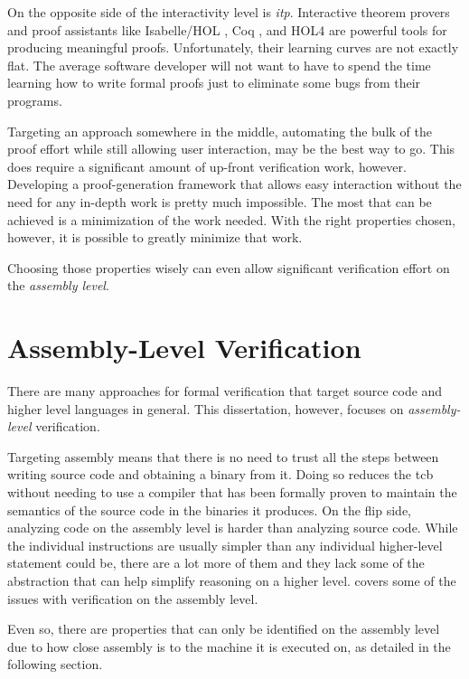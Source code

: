 On the opposite side of the interactivity level is \emph{\ac{itp}}.
Interactive theorem provers and proof assistants
like Isabelle/HOL \autocite{nipkow2002isabelle}, Coq \autocite{chlipala2013certified},
and HOL4  \autocite{slind2008brief} are powerful tools for producing meaningful proofs.
Unfortunately, their learning curves are not exactly flat.
The average software developer will not want to have to spend the time
learning how to write formal proofs just to eliminate some bugs from their programs.

Targeting an approach somewhere in the middle,
automating the bulk of the proof effort while still allowing user interaction,
may be the best way to go.
This does require a significant amount of up-front verification work, however.
Developing a proof-generation framework that allows easy interaction
without the need for any in-depth work is pretty much impossible.
The most that can be achieved is a minimization of the work needed.
With the right properties chosen, however, it is possible to greatly minimize that work.

Choosing those properties wisely can even allow significant verification effort
on the \emph{assembly level}.

\section{Assembly-Level Verification}
There are many approaches for formal verification that target source code
and higher level languages in general.
This dissertation, however, focuses on \emph{assembly-level} verification.

Targeting assembly means that there is no need to trust all the steps between
writing source code and obtaining a binary from it.
Doing so reduces the \ac{tcb} without needing to use a compiler
that has been formally proven to maintain the semantics of the source code
in the binaries it produces. On the flip side, analyzing code on the assembly level
is harder than analyzing source code.
While the individual instructions are usually simpler
than any individual higher-level statement could be,
there are a lot more of them and they lack some of the abstraction
that can help simplify reasoning on a higher level. 
covers some of the issues with verification on the assembly level.

Even so, there are properties that can only be identified on the assembly level
due to how close assembly is to the machine it is executed on,
as detailed in the following section.

